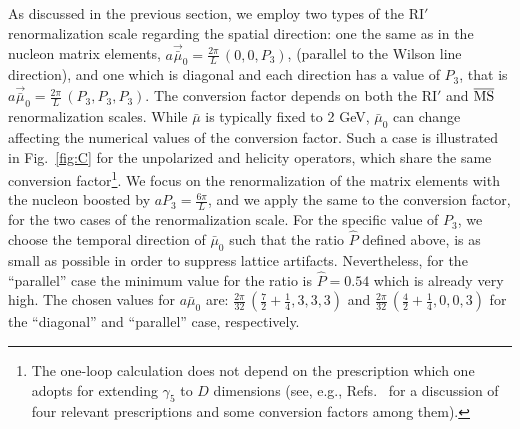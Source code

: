 \documentclass[12pt,tighten,nofootinbib,amssymb,floatfix]{article}
\newcommand{\MSb}{{\overline{\rm MS}}}
\begin{document}
\medskip
As discussed in the previous section, we employ two types of the RI$'$ renormalization scale regarding the spatial direction: 
one the same as in the nucleon matrix elements, $a\vec{\bar{\mu}}_0{=}\frac{2\pi}{L}\,(0,0,P_3)$, (parallel to the Wilson line direction), 
and one which is diagonal and each direction has a value of $P_3$, that is $a\vec{\bar{\mu}}_0{=}\frac{2\pi}{L}\,(P_3,P_3,P_3)$. 
The conversion factor depends on both the RI$'$ and $\MSb$ renormalization scales. While $\bar\mu$ is typically fixed to 2 GeV, 
$\bar\mu_0$ can change affecting the numerical values of the conversion factor. Such a case is illustrated in Fig.~\ref{fig:C} 
for the unpolarized and helicity operators, which share the same conversion factor\footnote{The one-loop calculation does not 
depend on the prescription which one adopts for extending $\gamma_5$ to $D$ dimensions (see, e.g.,
Refs.~\cite{Buras:1989xd,Patel:1992vu,Larin:1993tp,Larin:1993tq,Skouroupathis:2008mf,Constantinou:2013pba} 
for a discussion of four relevant prescriptions and some conversion factors among them).}. 
We focus on the renormalization of the matrix elements with the nucleon boosted by $a P_3{=}\frac{6\pi}{L}$, and we apply the same
to the conversion factor, for the two cases of the renormalization scale. For the specific value of $P_3$, we choose the temporal
direction of $\bar\mu_0$ such that the ratio $\hat{P}$ defined above, is as small as possible in order to suppress
lattice artifacts. Nevertheless, for the ``parallel'' case the minimum value for the ratio is $\hat{P}{=}0.54$ which is already very high.
The chosen values for $a\bar\mu_0$ are: $\frac{2\pi}{32}\, (\frac{7}{2}{+}\frac{1}{4}, 3,3,3)$ and 
$\frac{2\pi}{32}\, (\frac{4}{2}{+}\frac{1}{4}, 0,0,3)$ for the ``diagonal'' and ``parallel'' case, respectively. 
\end{document}
